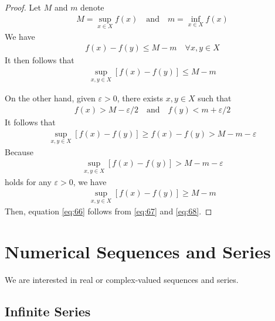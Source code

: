 \documentclass[thmcnt=section, 12pt]{my-elegantbook}
\begin{document}
\begin{proof}
    Let $M$ and $m$ denote 
    \begin{align*}
        M = \sup_{x \in X} f(x)
        \quad\text{and}\quad
        m = \inf_{x \in X} f(x)
    \end{align*}
    We have 
    \begin{align*}
        f(x) - f(y) \leq M - m
        \quad \forall x,y \in X
    \end{align*}
    It then follows that 
    \begin{align}
        \sup_{x,y \in X} [f(x) - f(y)]
        \leq M - m
        \label{eq:67}
    \end{align}

    On the other hand, given $\varepsilon > 0$, there exists $x, y \in X$ such that 
    \begin{align}
        f(x) > M - \varepsilon / 2
        \quad \text{and} \quad 
        f(y) < m + \varepsilon / 2
    \end{align} 
    It follows that 
    \begin{align*}
        \sup_{x,y \in X} [f(x) - f(y)]
        \geq f(x) - f(y)
        > M - m - \varepsilon
    \end{align*}
    Because 
    \begin{align*}
        \sup_{x,y \in X} [f(x) - f(y)]
        > M - m - \varepsilon
    \end{align*}
    holds for any $\varepsilon > 0$, we have 
    \begin{align}
        \sup_{x,y \in X} [f(x) - f(y)]
        \geq M - m
        \label{eq:68}
    \end{align}
    Then, equation \eqref{eq:66} follows from \eqref{eq:67} and \eqref{eq:68}.
\end{proof}


\chapter{Numerical Sequences and Series}

We are interested in real or complex-valued sequences and series.


\section{Infinite Series}
\end{document}
